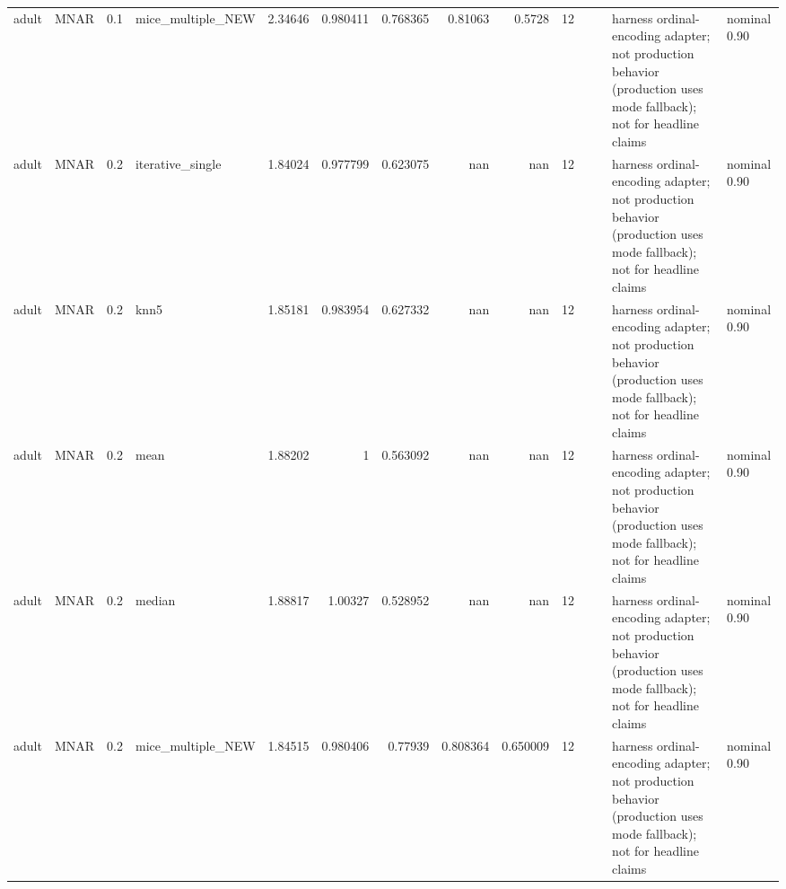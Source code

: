 \begin{table}[ht]
\begin{tabular}{llrlrrrrrrllll}
 adult                & MNAR        &         0.1 & mice\_multiple\_NEW &       2.34646  &             0.980411 &                 0.768365 &                       0.81063  &                         0.5728   &        12 &                    &                                         & harness ordinal-encoding adapter; not production behavior (production uses mode fallback); not for headline claims & nominal 0.90              \\
 adult                & MNAR        &         0.2 & iterative\_single  &       1.84024  &             0.977799 &                 0.623075 &                     nan        &                       nan        &        12 &                    &                                         & harness ordinal-encoding adapter; not production behavior (production uses mode fallback); not for headline claims & nominal 0.90              \\
 adult                & MNAR        &         0.2 & knn5              &       1.85181  &             0.983954 &                 0.627332 &                     nan        &                       nan        &        12 &                    &                                         & harness ordinal-encoding adapter; not production behavior (production uses mode fallback); not for headline claims & nominal 0.90              \\
 adult                & MNAR        &         0.2 & mean              &       1.88202  &             1        &                 0.563092 &                     nan        &                       nan        &        12 &                    &                                         & harness ordinal-encoding adapter; not production behavior (production uses mode fallback); not for headline claims & nominal 0.90              \\
 adult                & MNAR        &         0.2 & median            &       1.88817  &             1.00327  &                 0.528952 &                     nan        &                       nan        &        12 &                    &                                         & harness ordinal-encoding adapter; not production behavior (production uses mode fallback); not for headline claims & nominal 0.90              \\
 adult                & MNAR        &         0.2 & mice\_multiple\_NEW &       1.84515  &             0.980406 &                 0.77939  &                       0.808364 &                         0.650009 &        12 &                    &                                         & harness ordinal-encoding adapter; not production behavior (production uses mode fallback); not for headline claims & nominal 0.90              \\

\end{tabular}
\end{table}
